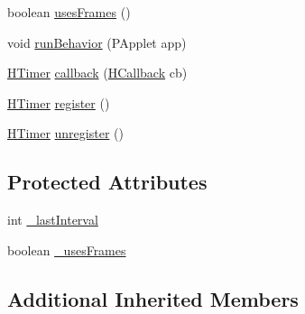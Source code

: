 \begin{DoxyCompactItemize}
boolean \hyperlink{classhype_1_1trigger_1_1_h_timer_abd2ee4b5e2c1636f2363e02102eb8d15}{uses\-Frames} ()
\item 
void \hyperlink{classhype_1_1trigger_1_1_h_timer_acd4c0d8417fcb4eae4599d46d9f9d7a1}{run\-Behavior} (P\-Applet app)
\item 
\hyperlink{classhype_1_1trigger_1_1_h_timer}{H\-Timer} \hyperlink{classhype_1_1trigger_1_1_h_timer_a92734f8e6faabf2227f412fb8a47a7ec}{callback} (\hyperlink{interfacehype_1_1interfaces_1_1_h_callback}{H\-Callback} cb)
\item 
\hyperlink{classhype_1_1trigger_1_1_h_timer}{H\-Timer} \hyperlink{classhype_1_1trigger_1_1_h_timer_a0b10b523b75cab9f449dc881f4842c5c}{register} ()
\item 
\hyperlink{classhype_1_1trigger_1_1_h_timer}{H\-Timer} \hyperlink{classhype_1_1trigger_1_1_h_timer_aaf113165ef2c2ee23d410916b297c008}{unregister} ()
\end{DoxyCompactItemize}
\subsection*{Protected Attributes}
\begin{DoxyCompactItemize}
\item 
int \hyperlink{classhype_1_1trigger_1_1_h_timer_a172caaedb3f2ef2fcb7b3a0a1aef17d3}{\-\_\-last\-Interval}
\item 
boolean \hyperlink{classhype_1_1trigger_1_1_h_timer_a9765f8be860ff8b30120cdddc85fe4e7}{\-\_\-uses\-Frames}
\end{DoxyCompactItemize}
\subsection*{Additional Inherited Members}


